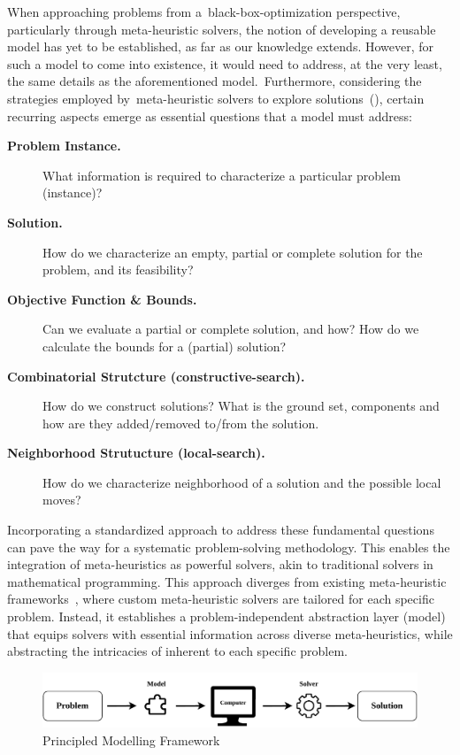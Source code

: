 When approaching problems from a~\acrshort{black-box-optimization} perspective,
particularly through \acrshort{meta-heuristic} solvers, the notion of developing
a reusable model has yet to be established, as far as our knowledge extends.
However, for such a model to come into existence, it would need to address, at
the very least, the same details as the aforementioned model.~Furthermore,
considering the strategies employed by~\acrshort{meta-heuristic} solvers to
explore solutions~(), certain recurring aspects emerge
as essential questions that a model must address:

\begin{description}
      \item[\textbf{Problem Instance.}] What information is required to characterize a particular problem (instance)?
      \item[\textbf{Solution.}] How do we characterize an empty, partial or complete solution for the problem, and its feasibility?
      \item[\textbf{Objective Function \& Bounds.}] Can we evaluate a partial or complete solution, and how? How do we calculate the bounds for a (partial) solution?
      \item[\textbf{Combinatorial Strutcture (\acrshort{constructive-search}).}] How do we construct solutions? What is the ground set, components and how are they added/removed to/from the solution.
      \item[\textbf{Neighborhood Strutucture (\acrshort{local-search}).}] How do we characterize neighborhood of a solution and the possible local moves?
\end{description}

Incorporating a standardized approach to address these fundamental questions can
pave the way for a systematic problem-solving methodology. This enables the
integration of meta-heuristics as powerful solvers, akin to traditional solvers
in mathematical programming. This approach diverges from existing meta-heuristic
frameworks~\cite{cahon2004paradiseoa,digaspero2003easylocal,durillo2011jmetal},
where custom meta-heuristic solvers are tailored for each specific problem.
Instead, it establishes a problem-independent abstraction layer (model) that
equips solvers with essential information across diverse meta-heuristics, while
abstracting the intricacies of inherent to each specific problem.

\begin{figure}[h]
      \centering
      \includegraphics[width=\textwidth,keepaspectratio]{../assets/modelling/modelling.pdf}
      \caption{Principled Modelling Framework}
      \label{fig:pmf}
\end{figure}

